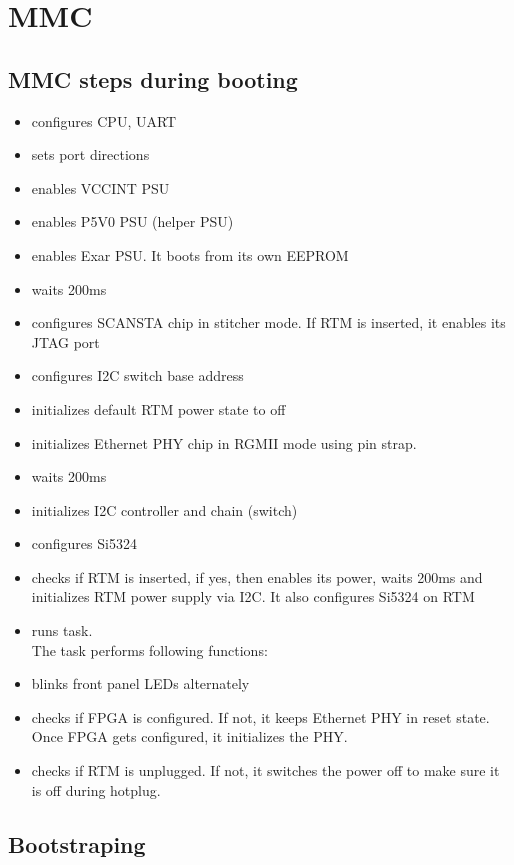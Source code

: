 \section{MMC}

\subsection{MMC steps during booting}

\begin{itemize}

\item configures CPU, UART
\item sets port directions
\item enables VCCINT PSU
\item enables P5V0 PSU (helper PSU)
\item enables Exar PSU. It boots from its own EEPROM
\item waits 200ms
\item configures SCANSTA chip in stitcher mode. If RTM is inserted, it enables its JTAG port
\item configures I2C switch base address
\item initializes default RTM power state to off
\item initializes Ethernet PHY chip in RGMII mode using pin strap.
\item waits 200ms
\item initializes I2C controller and chain (switch)
\item configures Si5324
\item checks if RTM is inserted, if yes, then enables its power, waits 200ms and initializes RTM power supply via I2C. It also configures Si5324 on RTM
\item runs task.\\

The task performs following functions:

\item blinks front panel LEDs alternately
\item checks if FPGA is configured. If not, it keeps Ethernet PHY in reset state. Once FPGA gets configured, it initializes the PHY.
\item checks if RTM is unplugged. If not, it switches the power off to make sure it is off during hotplug.
\end{itemize}

\subsection{Bootstraping}

